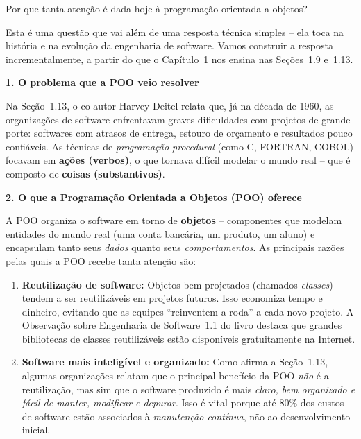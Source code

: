 \documentclass[12pt,a4paper]{article}
\begin{document}
\begin{enunciadoBox}[Enunciado]
Por que tanta atenção é dada hoje à programação orientada a objetos?
\end{enunciadoBox}

\bigskip

\begin{respostabox}

Esta é uma questão que vai além de uma resposta técnica simples -- ela toca na história
e na evolução da engenharia de software. Vamos construir a resposta incrementalmente,
a partir do que o Capítulo~1 nos ensina nas Seções~1.9 e~1.13.

\bigskip
\textbf{1. O problema que a POO veio resolver}

Na Seção~1.13, o co-autor Harvey Deitel relata que, já na década de 1960, as organizações
de software enfrentavam graves dificuldades com projetos de grande porte: softwares com
atrasos de entrega, estouro de orçamento e resultados pouco confiáveis. As técnicas de
\textit{programação procedural} (como C, FORTRAN, COBOL) focavam em \textbf{ações
(verbos)}, o que tornava difícil modelar o mundo real -- que é composto de
\textbf{coisas (substantivos)}.

\bigskip
\textbf{2. O que a Programação Orientada a Objetos (POO) oferece}

A POO organiza o software em torno de \textbf{objetos} -- componentes que modelam
entidades do mundo real (uma conta bancária, um produto, um aluno) e encapsulam
tanto seus \textit{dados} quanto seus \textit{comportamentos}. As principais razões
pelas quais a POO recebe tanta atenção são:

\begin{enumerate}
  \item \textbf{Reutilização de software:} Objetos bem projetados (chamados \textit{classes})
  tendem a ser reutilizáveis em projetos futuros. Isso economiza tempo e dinheiro, evitando
  que as equipes ``reinventem a roda'' a cada novo projeto. A Observação sobre Engenharia de
  Software~1.1 do livro destaca que grandes bibliotecas de classes reutilizáveis estão
  disponíveis gratuitamente na Internet.

  \item \textbf{Software mais inteligível e organizado:} Como afirma a Seção~1.13, algumas
  organizações relatam que o principal benefício da POO \textit{não} é a reutilização, mas
  sim que o software produzido é mais \textit{claro, bem organizado e fácil de manter,
  modificar e depurar}. Isso é vital porque até 80\% dos custos de software estão associados
  à \textit{manutenção contínua}, não ao desenvolvimento inicial.


\end{enumerate}
\end{respostabox}
\end{document}
